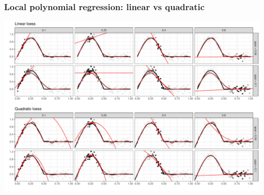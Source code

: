 \documentclass[pdf]{beamer}\usepackage[]{graphicx}\usepackage[]{color}
\makeatletter
\def\maxwidth{ %
  \ifdim\Gin@nat@width>\linewidth
    \linewidth
  \else
    \Gin@nat@width
  \fi
}
\newenvironment{knitrout}{}{} %
\makeatother
\begin{document}
\begin{frame}
\frametitle{Local polynomial regression: linear vs quadratic}

\begin{knitrout}
\color{fgcolor}

{\centering \includegraphics[width=\maxwidth]{figure/LoessComparison-1} 

}



\end{knitrout}

\end{frame}
\end{document}
